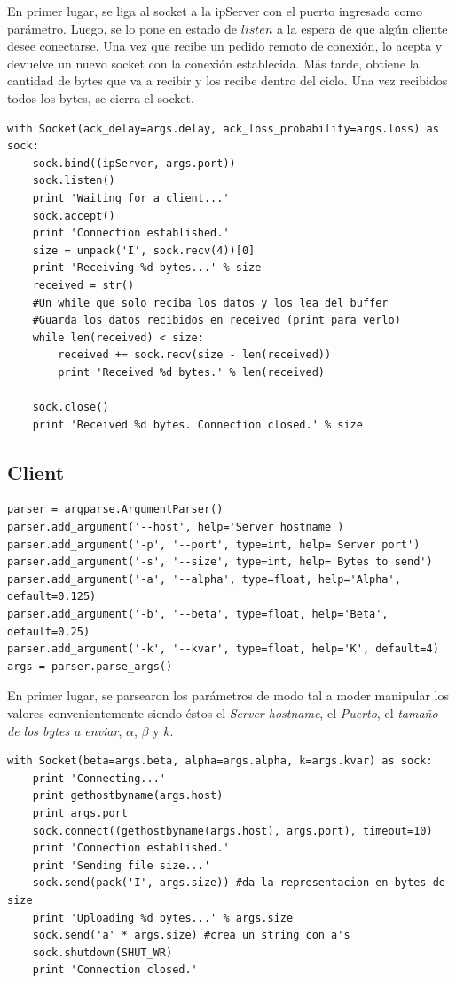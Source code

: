 \documentclass[10pt, a4paper]{article}
\begin{document}
En primer lugar, se liga al socket a la ipServer con el puerto ingresado como parámetro. Luego, se lo pone en estado de $listen$ a la espera de que algún cliente desee conectarse. Una vez que recibe un pedido remoto de conexión, lo acepta y devuelve un nuevo socket con la conexión establecida. Más tarde, obtiene la cantidad de bytes que va a recibir y los recibe dentro del ciclo. Una vez recibidos todos los bytes, se cierra el socket.

\begin{verbatim}
with Socket(ack_delay=args.delay, ack_loss_probability=args.loss) as sock:
    sock.bind((ipServer, args.port))
    sock.listen()
    print 'Waiting for a client...'
    sock.accept()
    print 'Connection established.'
    size = unpack('I', sock.recv(4))[0]
    print 'Receiving %d bytes...' % size
    received = str()
    #Un while que solo reciba los datos y los lea del buffer
    #Guarda los datos recibidos en received (print para verlo)
    while len(received) < size:
        received += sock.recv(size - len(received))
        print 'Received %d bytes.' % len(received)

    sock.close()
    print 'Received %d bytes. Connection closed.' % size
\end{verbatim}

\subsection{Client}
\begin{verbatim}
parser = argparse.ArgumentParser()
parser.add_argument('--host', help='Server hostname')
parser.add_argument('-p', '--port', type=int, help='Server port')
parser.add_argument('-s', '--size', type=int, help='Bytes to send')
parser.add_argument('-a', '--alpha', type=float, help='Alpha', default=0.125)
parser.add_argument('-b', '--beta', type=float, help='Beta', default=0.25)
parser.add_argument('-k', '--kvar', type=float, help='K', default=4)
args = parser.parse_args()
\end{verbatim}

En primer lugar, se parsearon los parámetros de modo tal a moder manipular los valores convenientemente siendo éstos el \textit{Server hostname}, el \textit{Puerto}, el \textit{tamaño de los bytes a enviar}, $\alpha$, $\beta$ y $k$.

\begin{verbatim}
with Socket(beta=args.beta, alpha=args.alpha, k=args.kvar) as sock:
    print 'Connecting...'
    print gethostbyname(args.host)
    print args.port
    sock.connect((gethostbyname(args.host), args.port), timeout=10)
    print 'Connection established.'
    print 'Sending file size...'
    sock.send(pack('I', args.size)) #da la representacion en bytes de size
    print 'Uploading %d bytes...' % args.size
    sock.send('a' * args.size) #crea un string con a's
    sock.shutdown(SHUT_WR)
	print 'Connection closed.'
\end{verbatim}
\end{document}
